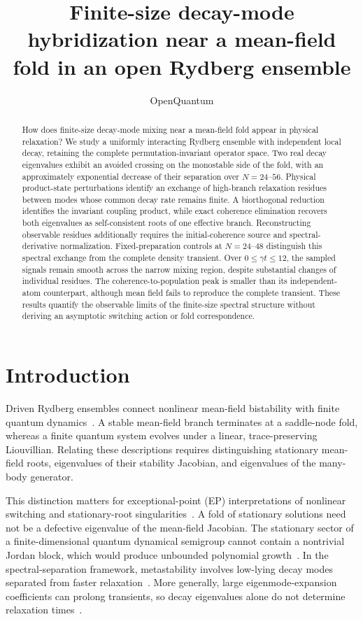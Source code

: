 \documentclass[aps,pra,twocolumn,superscriptaddress,amsmath,amssymb,reprint,floatfix]{revtex4-2}
\begin{document}
\title{Finite-size decay-mode hybridization near a mean-field fold in an open Rydberg ensemble}
\author{OpenQuantum}
\noaffiliation
\begin{abstract}
How does finite-size decay-mode mixing near a mean-field fold appear in physical relaxation? We study a uniformly interacting Rydberg ensemble with independent local decay, retaining the complete permutation-invariant operator space. Two real decay eigenvalues exhibit an avoided crossing on the monostable side of the fold, with an approximately exponential decrease of their separation over $N=24$--$56$. Physical product-state perturbations identify an exchange of high-branch relaxation residues between modes whose common decay rate remains finite. A biorthogonal reduction identifies the invariant coupling product, while exact coherence elimination recovers both eigenvalues as self-consistent roots of one effective branch. Reconstructing observable residues additionally requires the initial-coherence source and spectral-derivative normalization. Fixed-preparation controls at $N=24$--$48$ distinguish this spectral exchange from the complete density transient. Over $0\le\gamma t\le12$, the sampled signals remain smooth across the narrow mixing region, despite substantial changes of individual residues. The coherence-to-population peak is smaller than its independent-atom counterpart, although mean field fails to reproduce the complete transient. These results quantify the observable limits of the finite-size spectral structure without deriving an asymptotic switching action or fold correspondence.
\end{abstract}
\maketitle

\section{Introduction}
Driven Rydberg ensembles connect nonlinear mean-field bistability with finite quantum dynamics~\cite{Lee2012,LeeChan2013,Carr2013,Xie2025}. A stable mean-field branch terminates at a saddle-node fold, whereas a finite quantum system evolves under a linear, trace-preserving Liouvillian. Relating these descriptions requires distinguishing stationary mean-field roots, eigenvalues of their stability Jacobian, and eigenvalues of the many-body generator.

This distinction matters for exceptional-point (EP) interpretations of nonlinear switching and stationary-root singularities~\cite{SunYi2024,Xie2025,LiSunYi2026}. A fold of stationary solutions need not be a defective eigenvalue of the mean-field Jacobian. The stationary sector of a finite-dimensional quantum dynamical semigroup cannot contain a nontrivial Jordan block, which would produce unbounded polynomial growth~\cite{AlbertJiang2014}. In the spectral-separation framework, metastability involves low-lying decay modes separated from faster relaxation~\cite{Macieszczak2016,Minganti2018}. More generally, large eigenmode-expansion coefficients can prolong transients, so decay eigenvalues alone do not determine relaxation times~\cite{MoriShirai2020,Mori2021}.
\end{document}

